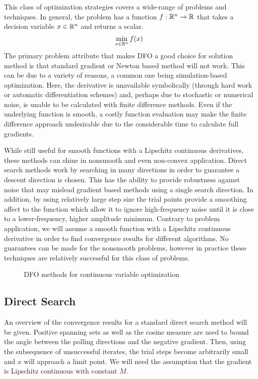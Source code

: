 This class of optimization strategies covers a wide-range of problems and techniques.  In general, the problem has a function $f: \mathbb{R}^{n} \rightarrow \mathbb{R}^{}$ that takes a decision variable $x \in \mathbb{R}^{n}$ and returns a scalar. 
\begin{equation}
\min_{x \in \mathbb{R}^{n}} f(x)
\end{equation}
The primary problem attribute that makes DFO a good choice for solution method is that standard gradient or Newton based method will not work.  This can be due to a variety of reasons, a common one being simulation-based optimization.  Here, the derivative is unavailable symbolically (through hard work or automatic differentiation schemes) and, perhaps due to stochastic or numerical noise, is unable to be calculated with finite difference methods.  Even if the underlying function is smooth, a costly function evaluation may make the finite difference approach undesirable due to the considerable time to calculate full gradients.

While still useful for smooth functions with a Lipschitz continuous derivatives, these methods can shine in nonsmooth and even non-convex application.  Direct search methods work by searching in many directions in order to guarantee a descent direction is chosen.  This has the ability to provide robustness against noise that may mislead gradient based methods using a single search direction.  In addition, by using relatively large step size the trial points provide a smoothing affect to the function which allow it to ignore high-frequency noise until it is close to a lower-frequency, higher amplitude minimum.  Contrary to problem application, we will assume a smooth function with a Lipschitz continuous derivative in order to find convergence results for different algorithms.  No guarantees can be made for the nonsmooth problems, however in practice these techniques are relatively successful for this class of problems.

\begin{figure}
\centering

\caption{DFO methods for continuous variable optimization}
\end{figure}

\subsection{Direct Search}
An overview of the convergence results for a standard direct search method will be given. Positive spanning sets as well as the cosine measure are used to bound the angle between the polling directions and the negative gradient.  Then, using the subsequence of unsuccessful iterates, the trial steps become arbitrarily small and $x$ will approach a limit point.  We will need the assumption that the gradient is Lipschitz continuous with constant $M$.

